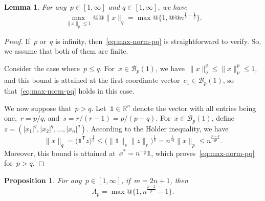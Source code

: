 \documentclass{article}
\numberwithin{equation}{section}
\theoremstyle{definition}
\theoremstyle{plain}
\newtheorem{proposition}{Proposition}[section]
\newtheorem{lemma}{Lemma}[section]
\theoremstyle{remark}
\newcommand*{\abs}[2][]{#1\lvert#2#1\rvert}
\newcommand*{\norm}[2][]{#1\lVert#2#1\rVert}
\newcommand*{\set}[2][]{#1\{#2#1\}}
\newcommand*{\R}{\mathbb{R}}
\newcommand*{\T}{\mathsf{T}}
\newcommand*{\ones}{\mathbb{1}}
\begin{document}
\begin{lemma}
    \label{lem:max-norm-pq}
    For any~$p \in [1, \infty]$ and $q \in [1, \infty]$, we have
    \begin{equation}
        \label{eq:max-norm-pq}
        \max_{\norm{x}_p \le 1} @@ \norm{x}_q = \max @ \set{1, @@ n^{\frac{1}{q} - \frac{1}{p}}}.
    \end{equation}
\end{lemma}

\begin{proof}
    If~$p$ or~$q$ is infinity, then~\eqref{eq:max-norm-pq} is straightforward to verify.
    So, we assume that both of them are finite.

    Consider the case where~$p \le q$.
    For~$x \in \mathcal{B}_p(1)$, we have~$\norm{x}_q^q \le \norm{x}_p^p \le 1$, and this bound is attained at the first coordinate vector~$e_1 \in \mathcal{B}_p(1)$, so that~\eqref{eq:max-norm-pq} holds in this case.

    We now suppose that~$p > q$.
    Let~$\ones \in \R^n$ denote the vector with all entries being one,~$r = p/q$, and~$s = r / (r - 1) = p / (p - q)$.
    For~$x \in \mathcal{B}_p(1)$, define~$z = (\abs{x_1}^q, \abs{x_2}^q, \dots, \abs{x_n}^q)$.
    According to the H{\"{o}}lder inequality, we have
    \begin{equation*}
        \norm{x}_q  = \big(\ones^{\T} z \big)^{\frac{1}{q}} \le \big(\norm{\ones}_s \norm{z}_r \big)
        ^{\frac{1}{q}} = n^{\frac{1}{sq}} \norm{x}_p \le n^{\frac{p - q}{qp}}.
    \end{equation*}
    Moreover, this bound is attained at~$x^\ast = n^{-\frac{1}{p}} \ones$, which proves~\eqref{eq:max-norm-pq} for~$p > q$.
\end{proof}

\begin{proposition}
    \label{prop:lambda-p-opt}
    For any~$p \in [1,\infty]$, if~$m = 2n + 1$, then
    \begin{equation*}
        \Lambda_p = \max @ \set[\big]{1, n^{\frac{p - 2}{p}} - 1}.
    \end{equation*}
\end{proposition}
\end{document}
